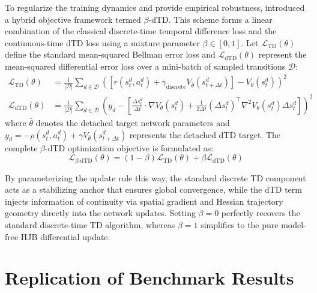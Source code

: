 \documentclass{article}
\begin{document}
To regularize the training dynamics and provide empirical robustness, \citet{settai2025} introduced a hybrid objective framework termed $\beta$-dTD. This scheme forms a linear combination of the classical discrete-time temporal difference loss and the continuous-time dTD loss using a mixture parameter $\beta \in [0, 1]$. Let $\mathcal{L}_{\text{TD}}(\theta)$ define the standard mean-squared Bellman error loss and $\mathcal{L}_{\text{dTD}}(\theta)$ represent the mean-squared differential error loss over a mini-batch of sampled transitions $\mathcal{D}$:
\begin{align}
    \mathcal{L}_{\text{TD}}(\theta) &= \frac{1}{|\mathcal{D}|} \sum_{d \in \mathcal{D}} \left( \left[ r(s_t^d, a_t^d) + \gamma_{\text{discrete}} V_{\bar{\theta}}(s_{t+\Delta t}^d) \right] - V_\theta(s_t^d) \right)^2 \\
    \mathcal{L}_{\text{dTD}}(\theta) &= \frac{1}{|\mathcal{D}|} \sum_{d \in \mathcal{D}} \left( y_d - \left[ \frac{\Delta s_t^d}{\Delta t} \cdot \nabla V_\theta(s_t^d) + \frac{1}{2\Delta t} (\Delta s_t^d)^\top \nabla^2 V_\theta(s_t^d) \Delta s_t^d \right] \right)^2
\end{align}
where $\bar{\theta}$ denotes the detached target network parameters and $y_d = -\rho(s_t^d, a_t^d) + \gamma V_{\bar{\theta}}(s_{t+\Delta t}^d)$ represents the detached dTD target. The complete $\beta$-dTD optimization objective is formulated as:
\begin{equation}
    \mathcal{L}_{\beta\text{-dTD}}(\theta) = (1 - \beta) \mathcal{L}_{\text{TD}}(\theta) + \beta \mathcal{L}_{\text{dTD}}(\theta)
\end{equation}

By parameterizing the update rule this way, the standard discrete TD component acts as a stabilizing anchor that ensures global convergence, while the dTD term injects information of continuity via spatial gradient and Hessian trajectory geometry directly into the network updates. Setting $\beta = 0$ perfectly recovers the standard discrete-time TD algorithm, whereas $\beta = 1$ simplifies to the pure model-free HJB differential update.

\section{Replication of Benchmark Results}
\label{sec:replication}
\end{document}
